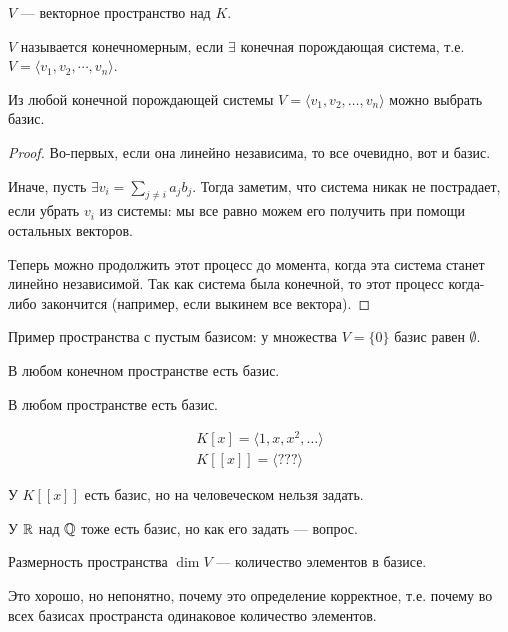 \begin{definition}
    $V$ --- векторное пространство над  $K$.

    $V$ называется конечномерным, если  $\exists$ конечная порождающая система, т.е. $V = \langle v_1, v_2, \cdots, v_n \rangle$.
\end{definition}
\begin{lemma}
    Из любой конечной порождающей системы $V = \langle v_1, v_2, \ldots, v_n \rangle$ можно выбрать базис.
\end{lemma}
\begin{proof}
    Во-первых, если она линейно независима, то все очевидно, вот и базис.

    Иначе, пусть $\exists v_i = \sum\limits_{j \neq i}a_j b_j$. Тогда заметим, что система никак не пострадает, если убрать $v_i$ из системы: мы все равно можем его получить при помощи остальных векторов. 

    Теперь можно продолжить этот процесс до момента, когда эта система станет линейно независимой. Так как система была конечной, то этот процесс когда-либо закончится (например, если выкинем все вектора).
\end{proof}

\begin{remark}
    Пример пространства с пустым базисом: у множества $V = \{ 0 \}$ базис равен  $\emptyset$.
\end{remark}
\begin{consequence}
    В любом конечном пространстве есть базис.
\end{consequence}
\begin{remark}
    В любом пространстве есть базис.
\end{remark}
\begin{example}
    \begin{align*}
        K[x] = \langle 1, x, x^2,  \ldots \rangle \\
        K[[x]] = \langle ??? \rangle
    \end{align*}

    У $K[[x]]$ есть базис, но на человеческом нельзя задать.
    
    У $\mathbb{R}$ над $\mathbb{Q}$ тоже есть базис, но как его задать --- вопрос.
\end{example}
\begin{definition}
    Размерность пространства $\dim V$ --- количество элементов в базисе.
\end{definition}

Это хорошо, но непонятно, почему это определение корректное, т.е. почему во всех базисах пространста одинаковое количество элементов.


